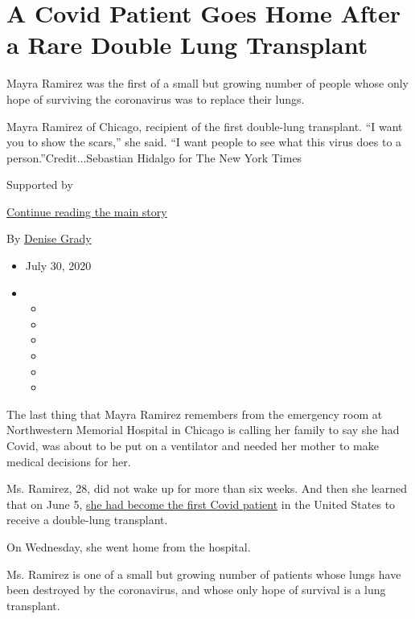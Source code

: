 \hypertarget{a-covid-patient-goes-home-after-a-rare-double-lung-transplant}{%
\section{A Covid Patient Goes Home After a Rare Double Lung
Transplant}\label{a-covid-patient-goes-home-after-a-rare-double-lung-transplant}}

Mayra Ramirez was the first of a small but growing number of people
whose only hope of surviving the coronavirus was to replace their lungs.

Mayra Ramirez of Chicago, recipient of the first double-lung transplant.
``I want you to show the scars,'' she said. ``I want people to see what
this virus does to a person.''Credit...Sebastian Hidalgo for The New
York Times

Supported by

\protect\hyperlink{after-sponsor}{Continue reading the main story}

By \href{https://www.nytimes3xbfgragh.onion/by/denise-grady}{Denise
Grady}

\begin{itemize}
\item
  July 30, 2020
\item
  \begin{itemize}
  \item
  \item
  \item
  \item
  \item
  \item
  \end{itemize}
\end{itemize}

The last thing that Mayra Ramirez remembers from the emergency room at
Northwestern Memorial Hospital in Chicago is calling her family to say
she had Covid, was about to be put on a ventilator and needed her mother
to make medical decisions for her.

Ms. Ramirez, 28, did not wake up for more than six weeks. And then she
learned that on June 5,
\href{https://www.nytimes3xbfgragh.onion/2020/06/11/health/coronavirus-lung-transplant.html?searchResultPosition=2}{she
had become the first Covid patient} in the United States to receive a
double-lung transplant.

On Wednesday, she went home from the hospital.

Ms. Ramirez is one of a small but growing number of patients whose lungs
have been destroyed by the coronavirus, and whose only hope of survival
is a lung transplant.

